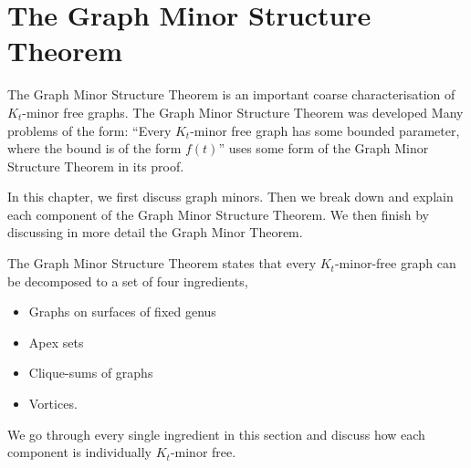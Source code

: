 \chapter{The Graph Minor Structure Theorem}

The Graph Minor Structure Theorem is an important coarse characterisation of $K_t$-minor free graphs. The Graph Minor Structure Theorem was developed  Many problems of the form: ``Every $K_t$-minor free graph has some bounded parameter, where the bound is of the form $f(t)$'' uses some form of the Graph Minor Structure Theorem in its proof. 


In this chapter, we first discuss graph minors. Then we break down and explain each component of the Graph Minor Structure Theorem. We then finish by discussing in more detail the Graph Minor Theorem.

The Graph Minor Structure Theorem states that every $K_t$-minor-free graph can be decomposed to a set of four ingredients, 
\begin{itemize}
	\item Graphs on surfaces of fixed genus
	\item Apex sets
	\item Clique-sums of graphs
	\item Vortices.
\end{itemize}
We go through every single ingredient in this section and discuss how each component is individually $K_t$-minor free. 









